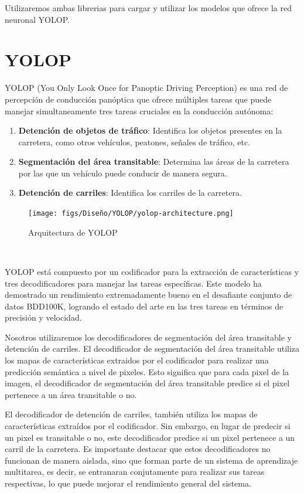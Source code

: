 Utilizaremos ambas librerias para cargar y utilizar los modelos que ofrece la red neuronal YOLOP.
\section{YOLOP}
\label{sec:YOLOP}
YOLOP\cite{YOLOP} (You Only Look Once for Panoptic Driving Perception) es una red de percepción
de conducción panóptica que ofrece múltiples tareas que puede
manejar simultaneamente tres tareas cruciales en la conducción autónoma: 
\begin{enumerate}
  \item \textbf{Detención de objetos de tráfico}: Identifica los objetos presentes en la carretera, como otros vehículos, peatones, señales de tráfico, etc.
  \item \textbf{Segmentación del área transitable}: Determina las áreas de la carretera por las que un vehículo puede conducir de manera segura.
  \item \textbf{Detención de carriles}: Identifica los carriles de la carretera.
\end{enumerate}

\begin{figure} [H]
  \begin{center}
    \texttt{[image: figs/Diseño/YOLOP/yolop-architecture.png]}
  \end{center}
  \caption{Arquitectura de YOLOP}
  \label{fig:Arq_YOLOP}
\end{figure}\

YOLOP está compuesto por un codificador para la extracción de características y tres decodificadores para manejar las tareas específicas. Este modelo ha demostrado un rendimiento 
extremadamente bueno en el desafiante conjunto de datos BDD100K\cite{BDD100K}, logrando el estado del arte en las tres tareas en términos de precisión y velocidad. \newline

Nosotros utilizaremos los decodificadores de segmentación del área transitable 
y detención de carriles. El decodificador de segmentación del área transitable utiliza los mapas de características
extraidos por el codificador para realizar una predicción semántica a nivel de pixeles. Esto significa que 
para cada pixel de la imagen, el decodificador de segmentación del área transitable predice si el pixel 
pertenece a un área transitable o no. \newline

El decodificador de detención de carriles, también utiliza los mapas de características extraídos 
por el codificador. Sin embargo, en lugar de predecir si un pixel es transitable o no, este decodificador
predice si un pixel pertenece a un carril de la carretera. \newline
Es importante destacar que estos decodificadores no funcionan de manera aislada, sino que forman parte
de un sistema de aprendizaje multitarea, es decir, se entranaran conjutamente para realizar sus tareas
respectivas, lo que puede mejorar el rendimiento general del sistema.\newline

